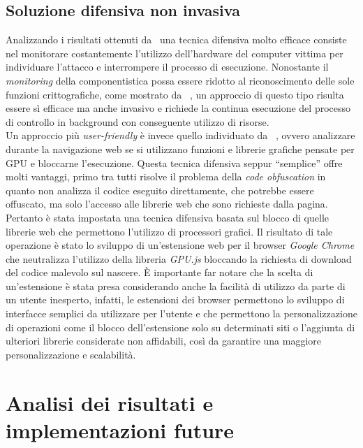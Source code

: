 \documentclass[conference, italian]{IEEEtran}
\newcommand\citen[1]{\citeauthor{#1} \citep{#1}}
\begin{document}
\subsection{Soluzione difensiva non invasiva}\label{sec:non-invasive-defence}
Analizzando i risultati ottenuti da~\citen{wang2018seismic} una tecnica difensiva molto efficace consiste nel monitorare costantemente l'utilizzo dell'hardware del computer vittima per individuare l'attacco e interrompere il processo di esecuzione. Nonostante il \emph{monitoring} della componentistica possa essere ridotto al riconoscimento delle sole funzioni crittografiche, come mostrato da~\citen{konoth2018minesweeper}, un approccio di questo tipo risulta essere sì efficace ma anche invasivo e richiede la continua esecuzione del processo di controllo in background con conseguente utilizzo di risorse.\\
Un approccio più \emph{user-friendly} è invece quello individuato da~\citen{belkin2019risks}, ovvero analizzare durante la navigazione web se si utilizzano funzioni e librerie grafiche pensate per GPU e bloccarne l'esecuzione. Questa tecnica difensiva seppur ``semplice'' offre molti vantaggi, primo tra tutti risolve il problema della \emph{code obfuscation} in quanto non analizza il codice eseguito direttamente, che potrebbe essere offuscato, ma solo l'accesso alle librerie web che sono richieste dalla pagina. Pertanto è stata impostata una tecnica difensiva basata sul blocco di quelle librerie web che permettono l'utilizzo di processori grafici. Il risultato di tale operazione è stato lo sviluppo di un'estensione web per il browser \emph{Google Chrome} che neutralizza l'utilizzo della libreria \emph{GPU.js} bloccando la richiesta di download del codice malevolo sul nascere. È importante far notare che la scelta di un'estensione è stata presa considerando anche la facilità di utilizzo da parte di un utente inesperto, infatti, le estensioni dei browser permettono lo sviluppo di interfacce semplici da utilizzare per l'utente e che permettono la personalizzazione di operazioni come il blocco dell'estensione solo su determinati siti o l'aggiunta di ulteriori librerie considerate non affidabili, così da garantire una maggiore personalizzazione e scalabilità.


\section{Analisi dei risultati e implementazioni future}\label{sec:results-analysis}
\end{document}
